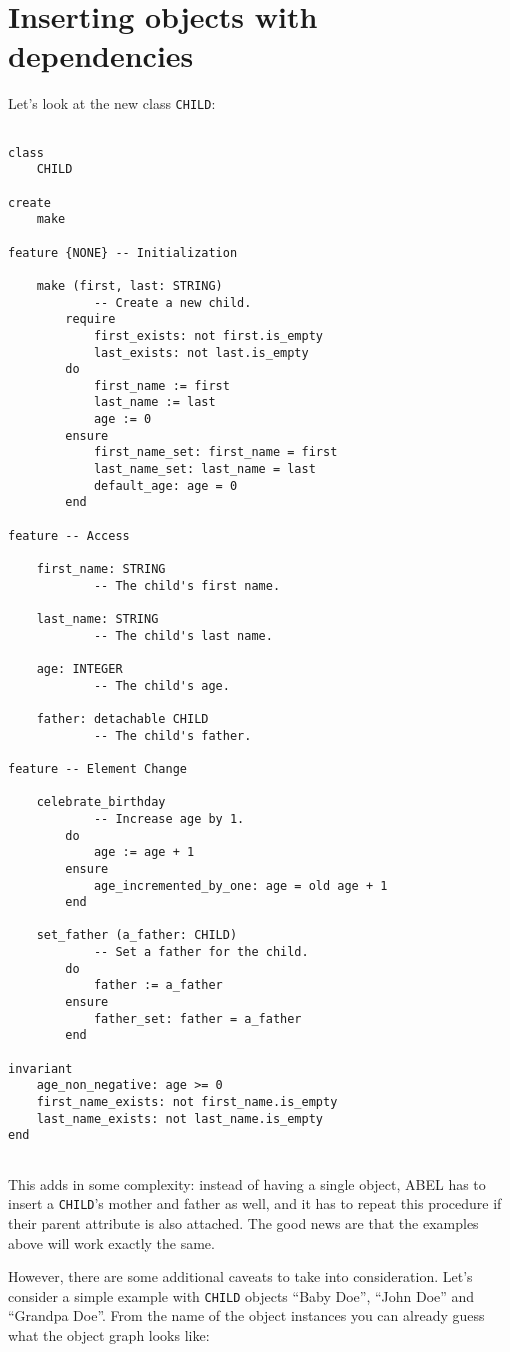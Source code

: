 \documentclass[a4paper,12pt]{report}
\begin{document}
\section{Inserting objects with dependencies}
Let's look at the new class \lstinline!CHILD!:

\begin{lstlisting}[language=OOSC2Eiffel, captionpos=b, caption={The CHILD class.}, label={lst:child_class}]

class
	CHILD

create
	make

feature {NONE} -- Initialization

	make (first, last: STRING)
			-- Create a new child.
		require
			first_exists: not first.is_empty
			last_exists: not last.is_empty
		do
			first_name := first
			last_name := last
			age := 0
		ensure
			first_name_set: first_name = first
			last_name_set: last_name = last
			default_age: age = 0
		end

feature -- Access

	first_name: STRING
			-- The child's first name.

	last_name: STRING
			-- The child's last name.

	age: INTEGER
			-- The child's age.

	father: detachable CHILD
			-- The child's father.

feature -- Element Change

	celebrate_birthday
			-- Increase age by 1.
		do
			age := age + 1
		ensure
			age_incremented_by_one: age = old age + 1
		end

	set_father (a_father: CHILD)
			-- Set a father for the child.
		do
			father := a_father
		ensure
			father_set: father = a_father
		end

invariant
	age_non_negative: age >= 0
	first_name_exists: not first_name.is_empty
	last_name_exists: not last_name.is_empty
end


\end{lstlisting}


This adds in some complexity: 
instead of having a single object, ABEL has to insert a \lstinline!CHILD!'s mother and father as well, and it has to repeat this procedure if their parent attribute is also attached. 
The good news are that the examples above will work exactly the same.

However, there are some additional caveats to take into consideration. 
Let's consider a simple example with \lstinline!CHILD! objects ``Baby Doe'', ``John Doe'' and ``Grandpa Doe''.
From the name of the object instances you can already guess what the object graph looks like: 
\end{document}
